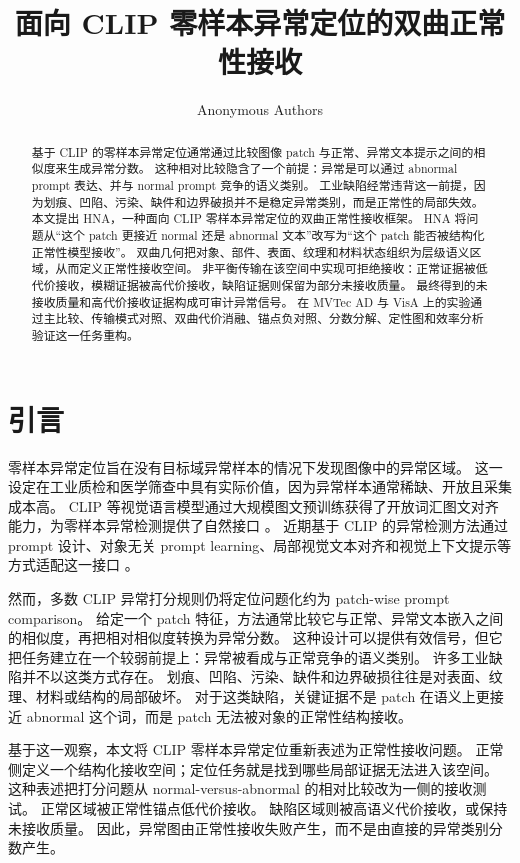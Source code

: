\documentclass[10pt,fontset=none]{ctexart}
\title{面向 CLIP 零样本异常定位的双曲正常性接收}
\author{Anonymous Authors}
\date{}
\newcommand{\method}{HNA}
\begin{document}
\maketitle

\begin{abstract}
基于 CLIP 的零样本异常定位通常通过比较图像 patch 与正常、异常文本提示之间的相似度来生成异常分数。
这种相对比较隐含了一个前提：异常是可以通过 abnormal prompt 表达、并与 normal prompt 竞争的语义类别。
工业缺陷经常违背这一前提，因为划痕、凹陷、污染、缺件和边界破损并不是稳定异常类别，而是正常性的局部失效。
本文提出 \method{}，一种面向 CLIP 零样本异常定位的双曲正常性接收框架。
\method{} 将问题从“这个 patch 更接近 normal 还是 abnormal 文本”改写为“这个 patch 能否被结构化正常性模型接收”。
双曲几何把对象、部件、表面、纹理和材料状态组织为层级语义区域，从而定义正常性接收空间。
非平衡传输在该空间中实现可拒绝接收：正常证据被低代价接收，模糊证据被高代价接收，缺陷证据则保留为部分未接收质量。
最终得到的未接收质量和高代价接收证据构成可审计异常信号。
在 MVTec AD 与 VisA 上的实验通过主比较、传输模式对照、双曲代价消融、锚点负对照、分数分解、定性图和效率分析验证这一任务重构。
\end{abstract}

\section{引言}

零样本异常定位旨在没有目标域异常样本的情况下发现图像中的异常区域。
这一设定在工业质检和医学筛查中具有实际价值，因为异常样本通常稀缺、开放且采集成本高。
CLIP 等视觉语言模型通过大规模图文预训练获得了开放词汇图文对齐能力，为零样本异常检测提供了自然接口 \cite{radford2021clip}。
近期基于 CLIP 的异常检测方法通过 prompt 设计、对象无关 prompt learning、局部视觉文本对齐和视觉上下文提示等方式适配这一接口 \cite{jeong2023winclip,zhou2024anomalyclip,chen2023aprilgan,qu2024vcpclip,ma2025aaclip}。

然而，多数 CLIP 异常打分规则仍将定位问题化约为 patch-wise prompt comparison。
给定一个 patch 特征，方法通常比较它与正常、异常文本嵌入之间的相似度，再把相对相似度转换为异常分数。
这种设计可以提供有效信号，但它把任务建立在一个较弱前提上：异常被看成与正常竞争的语义类别。
许多工业缺陷并不以这类方式存在。
划痕、凹陷、污染、缺件和边界破损往往是对表面、纹理、材料或结构的局部破坏。
对于这类缺陷，关键证据不是 patch 在语义上更接近 abnormal 这个词，而是 patch 无法被对象的正常性结构接收。

基于这一观察，本文将 CLIP 零样本异常定位重新表述为正常性接收问题。
正常侧定义一个结构化接收空间；定位任务就是找到哪些局部证据无法进入该空间。
这种表述把打分问题从 normal-versus-abnormal 的相对比较改为一侧的接收测试。
正常区域被正常性锚点低代价接收。
缺陷区域则被高语义代价接收，或保持未接收质量。
因此，异常图由正常性接收失败产生，而不是由直接的异常类别分数产生。
\end{document}
